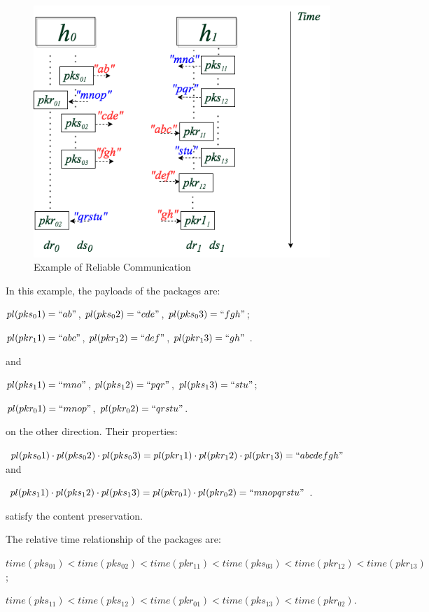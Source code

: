 \begin{figure}[H]
\centerline{\includegraphics[scale=0.55]{Figures/reliableexample}}
\caption{Example of Reliable Communication}
\label{reliableexample}
\end{figure}

In this example, the payloads of the packages are:

$pl(pks_01)=``ab"$, $ pl(pks_02)=``cde"$, $pl(pks_03)=``fgh"$;

$pl(pkr_11)=``abc"$, $pl(pkr_12)=``def"$, $pl(pkr_13)=``gh"$ .

and 

$pl(pks_11)=``mno"$, $pl(pks_12)=``pqr"$, $pl(pks_13)=``stu"$;

$pl(pkr_01)=``mnop"$, $pl(pkr_02)=``qrstu"$. 

on the other direction. Their properties:

$pl(pks_01) \cdot pl(pks_02) \cdot pl(pks_03) = pl(pkr_11) \cdot pl(pkr_12) \cdot pl(pkr_13) = ``abcdefgh"$ and 

$pl(pks_11) \cdot pl(pks_12) \cdot pl(pks_13) = pl(pkr_01) \cdot pl(pkr_02) = ``mnopqrstu"$. 

satisfy the content preservation. 

The relative time relationship of the packages are: 

$time(pks_01) < time(pks_02) < time(pkr_11)< time(pks_03) < time(pkr_12) < time(pkr_13) $;

$time(pks_11) < time(pks_12) < time(pkr_01)< time(pks_13) < time(pkr_02)$. 


